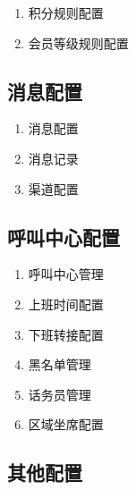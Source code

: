 \documentclass[UTF8]{ctexart}
\begin{document}
\begin{enumerate}
	\item 积分规则配置
	
	\item 会员等级规则配置
	
\end{enumerate}


\subsection{消息配置}

\begin{enumerate}
	\item 消息配置
	
	\item 消息记录
	
	\item 渠道配置
	
\end{enumerate}


\subsection{呼叫中心配置}

\begin{enumerate}
	\item 呼叫中心管理
	
	\item 上班时间配置
	
	\item 下班转接配置
	
	\item 黑名单管理
	
	\item 话务员管理
	
	\item 区域坐席配置
	
\end{enumerate}


\subsection{其他配置}
\end{document}
